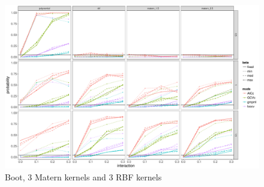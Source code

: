 \documentclass[11pt]{article}
\begin{document}
\begin{figure}
\begin{center}
\includegraphics[width=0.9\columnwidth]{exp_B5} 
\caption{Boot, 3 Matern kernels and 3 RBF kernels}
\label{fig:res}
\end{center}
\end{figure}


\clearpage



\end{document}
